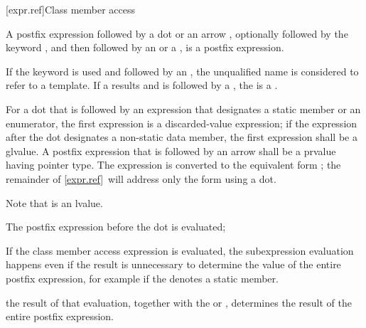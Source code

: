 [expr.ref]{Class member access}

\pnum
{}%
%
%
%
%
%
%
%
%
%
A postfix expression followed by a dot  or an arrow \tcode{->},
optionally followed by the keyword
, and then followed by an
 or a ,
is a postfix expression.
\begin{note}
If the keyword  is used and
followed by an ,
the unqualified name
is considered to refer to a template.
If a  results and is followed by a \tcode{::},
the  is a .
\end{note}

\pnum
{}%
For a dot that is followed by an expression
that designates a static member or an enumerator,
the first expression is a discarded-value expression;
if the expression after the dot designates a non-static data member,
the first expression shall be a glvalue.
A postfix expression that is followed by an arrow
shall be a prvalue having pointer type.
The expression  is
converted to the equivalent form ; the remainder of
\ref{expr.ref}~will address only the form using a dot.
\begin{footnote}
Note that
 is an lvalue.
\end{footnote}

\pnum
The postfix expression before the dot is evaluated;
\begin{footnote}
If the class member
access expression is evaluated, the subexpression evaluation happens even if the
result is unnecessary to determine
the value of the entire postfix expression, for example if the
 denotes a static member.
\end{footnote}
the result of that evaluation,
together with
the  or ,
determines the result of the entire postfix expression.

